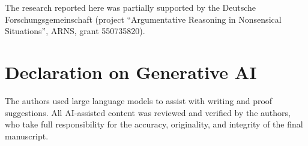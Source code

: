 \documentclass[
]{ceurart}
\begin{document}

\begin{acknowledgments}
  The research reported here was partially supported by the Deutsche Forschungsgemeinschaft (project ``Argumentative Reasoning in Nonsensical Situations'', ARNS, grant 550735820).
\end{acknowledgments}

\section*{Declaration on Generative AI}
 The authors used large language models to assist with writing and proof suggestions. All AI-assisted content was reviewed and verified by the authors, who take full responsibility for the accuracy, originality, and integrity of the final manuscript.
  

\end{document}

